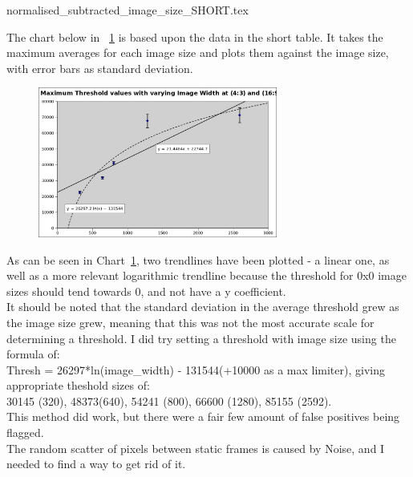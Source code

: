 {normalised_subtracted_image_size_SHORT.tex}

The chart below in ~\cref{chart:thresholds} is based upon the data in the short table. It takes the maximum averages for each image size and plots them against the image size, with error bars as standard deviation.\\

\begin{figure}
	\vspace{-10pt}
	\begin{center}
		\includegraphics[width=0.7\textwidth]{../images/chart-threshold-with-varying-image}
	\end{center}
	\vspace{-15pt}
	\caption{}
	\label{chart:thresholds}
	\vspace{-10pt}
\end{figure}

As can be seen in Chart~\cref{chart:thresholds}, two trendlines have been plotted - a linear one, as well as a more relevant logarithmic trendline because the threshold for 0x0 image sizes should tend towards 0, and not have a y coefficient.\\
It should be noted that the standard deviation in the average threshold grew as the image size grew, meaning that this was not the most accurate scale for determining a threshold. I did try setting a threshold with image size using the formula of:\\
 Thresh = 26297*ln(image\_width) - 131544(+10000 as a max limiter),  giving appropriate theshold sizes of:\\
30145 (320), 48373(640), 54241 (800), 66600 (1280), 85155 (2592).\\
This method did work, but there were a fair few amount of false positives being flagged.
\\The random scatter of pixels between static frames is caused by Noise, and I needed to find a way to get rid of it.

